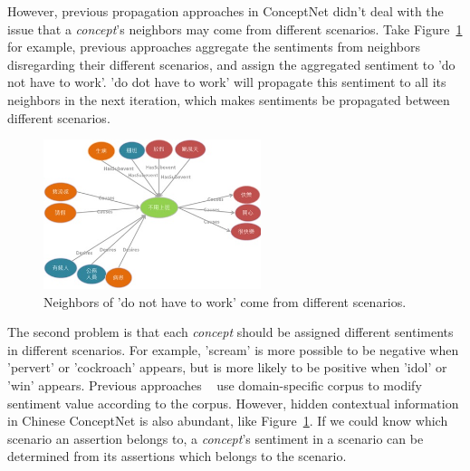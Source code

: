 However, previous propagation approaches in ConceptNet didn't deal with the issue that a {\it concept}'s neighbors may come from different scenarios. Take Figure~\ref{fig:noWork2} for example, previous approaches aggregate the sentiments from neighbors disregarding their different scenarios, and assign the aggregated sentiment to 'do not have to work'. 'do dot have to work' will propagate this sentiment to all its neighbors in the next iteration, which makes sentiments be propagated between different scenarios.

\begin{figure}[!t]
\centering
\includegraphics[width=2.5in]{fig/noWork2.jpg}
\caption{Neighbors of 'do not have to work' come from different scenarios.}
\label{fig:noWork2}
\end{figure}

The second problem is that each {\it concept} should be assigned different sentiments in different scenarios. For example, 'scream' is more possible to be negative when 'pervert' or 'cockroach' appears, but is more likely to be positive when 'idol' or 'win' appears. Previous approaches ~\cite{Xu:PACLIC10, Xu:COLING10, Rao:WWW14} use domain-specific corpus to modify sentiment value according to the corpus. However, hidden contextual information in Chinese ConceptNet is also abundant, like Figure~\ref{fig:noWork2}. If we could know which scenario an assertion belongs to, a {\it concept}'s sentiment in a scenario can be determined from its assertions which belongs to the scenario. 

